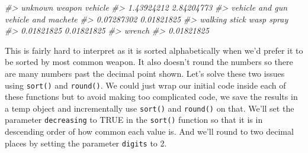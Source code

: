 \documentclass[
  12pt,
]{book}
\newenvironment{Shaded}{\begin{snugshade}}{\end{snugshade}}
\newcommand{\CommentTok}[1]{\textcolor[rgb]{0.37,0.37,0.37}{\textit{#1}}}
\begin{document}
\begin{Shaded}
\begin{Highlighting}[]
\CommentTok{\#>                   unknown weapon                          vehicle }
\CommentTok{\#>                       1.43924212                       2.84204773 }
\CommentTok{\#>                  vehicle and gun              vehicle and machete }
\CommentTok{\#>                       0.07287302                       0.01821825 }
\CommentTok{\#>                    walking stick                       wasp spray }
\CommentTok{\#>                       0.01821825                       0.01821825 }
\CommentTok{\#>                           wrench }
\CommentTok{\#>                       0.01821825}
\end{Highlighting}
\end{Shaded}

This is fairly hard to interpret as it is sorted alphabetically when we'd prefer it to be sorted by most common weapon. It also doesn't round the numbers so there are many numbers past the decimal point shown. Let's solve these two issues using \texttt{sort()} and \texttt{round()}. We could just wrap our initial code inside each of these functions but to avoid making too complicated code, we save the results in a temp object and incrementally use \texttt{sort()} and \texttt{round()} on that. We'll set the parameter \texttt{decreasing} to TRUE in the \texttt{sort()} function so that it is in descending order of how common each value is. And we'll round to two decimal places by setting the parameter \texttt{digits} to 2.
\end{document}
